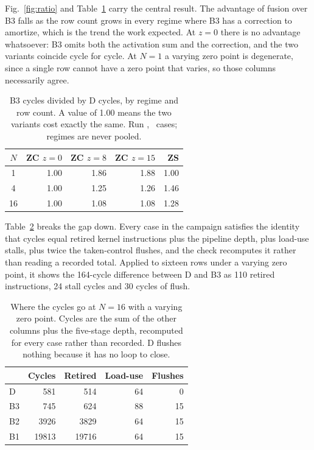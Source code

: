 Fig.~\ref{fig:ratio} and Table~\ref{tab:ratio} carry the central result. The
advantage of fusion over B3 falls as the row count grows in every regime where
B3 has a correction to amortize, which is the trend the work expected. At
\(z{=}0\) there is no advantage whatsoever: B3 omits both the activation sum
and the correction, and the two variants coincide cycle for cycle. At
\(N{=}1\) a varying zero point is degenerate, since a single row cannot have a
zero point that varies, so those columns necessarily agree.



\begin{table}[!htbp]
\caption{B3 cycles divided by D cycles, by regime and row count. A value of
1.00 means the two variants cost exactly the same. Run \CampaignRun,
\CampaignCases\ cases; regimes are never pooled.}
\label{tab:ratio}
\centering
\begin{tabular}{crrrr}
\hline
\(N\) & ZC \(z{=}0\) & ZC \(z{=}8\) & ZC \(z{=}15\) & ZS \\
\hline
1 & 1.00 & 1.86 & 1.88 & 1.00 \\
4 & 1.00 & 1.25 & 1.26 & 1.46 \\
16 & 1.00 & 1.08 & 1.08 & 1.28 \\
\hline
\end{tabular}
\end{table}

Table~\ref{tab:breakdown} breaks the gap down. Every case in the campaign satisfies
the identity that cycles equal retired kernel instructions plus the pipeline
depth, plus load-use stalls, plus twice the taken-control flushes, and the check
recomputes it rather than reading a recorded total. Applied to sixteen rows
under a varying zero point, it shows the 164-cycle difference between D and B3
as 110 retired instructions, 24 stall cycles and 30 cycles of flush.

\begin{table}[!htbp]
\caption{Where the cycles go at \(N{=}16\) with a varying zero point. Cycles are
the sum of the other columns plus the five-stage depth, recomputed for every
case rather than recorded. D flushes nothing because it has no loop to close.}
\label{tab:breakdown}
\centering
\begin{tabular}{lrrrr}
\hline
 & Cycles & Retired & Load-use & Flushes \\
\hline
D & 581 & 514 & 64 & 0 \\
B3 & 745 & 624 & 88 & 15 \\
B2 & 3926 & 3829 & 64 & 15 \\
B1 & 19813 & 19716 & 64 & 15 \\
\hline
\end{tabular}
\end{table}

